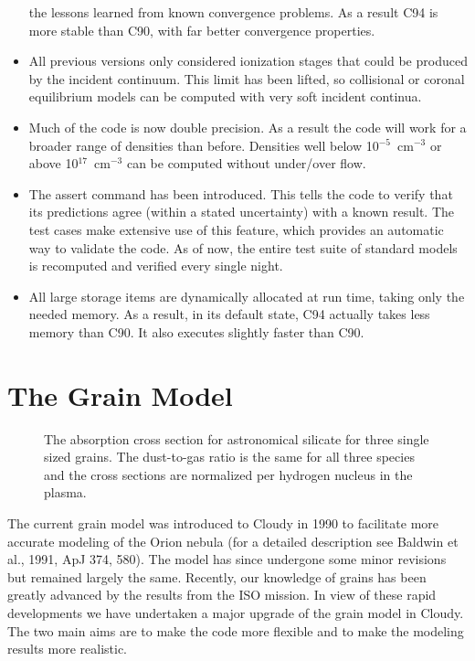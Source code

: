 \begin{itemize}
    the lessons learned from known convergence problems. As a result C94 is
    more stable than C90, with far better convergence properties.
\item
  All previous versions only considered ionization stages that could be
    produced by the incident continuum. This limit has been lifted, so
    collisional or coronal equilibrium models can be computed with very soft
    incident continua.
\item
  Much of the code is now double precision. As a result the code will work for
    a broader range of densities than before. Densities well below
    10$^{-5}$~cm$^{-3}$ or above 10$^{17}$~cm$^{-3}$ can be computed without
    under/over flow.
\item
  The assert command has been introduced. This tells the code to verify that
    its predictions agree (within a stated uncertainty) with a known result.
    The test cases make extensive use of this feature, which provides an
    automatic way to validate the code. As of now, the entire test suite of
    standard models is recomputed and verified every single night.
\item
  All large storage items are dynamically allocated at run time, taking only
    the needed memory. As a result, in its default state, C94 actually takes
    less memory than C90. It also executes slightly faster than C90.
\end{itemize}

\section{The Grain Model}

\begin{figure}
\caption{ 
The absorption cross section for astronomical silicate for three
single sized grains. The dust-to-gas ratio is the same for all three species
and the cross sections are normalized per hydrogen nucleus in the plasma.}
\end{figure}

The current grain model was introduced to Cloudy in 1990 to facilitate more
accurate modeling of the Orion nebula (for a detailed description see
Baldwin et al., 1991, ApJ 374, 580). The model has since undergone some minor
revisions but remained largely the same. Recently, our knowledge of grains
has been greatly advanced by the results from the ISO mission. In view of
these rapid developments we have undertaken a major upgrade of the grain
model in Cloudy. The two main aims are to make the code more flexible and
to make the modeling results more realistic.

